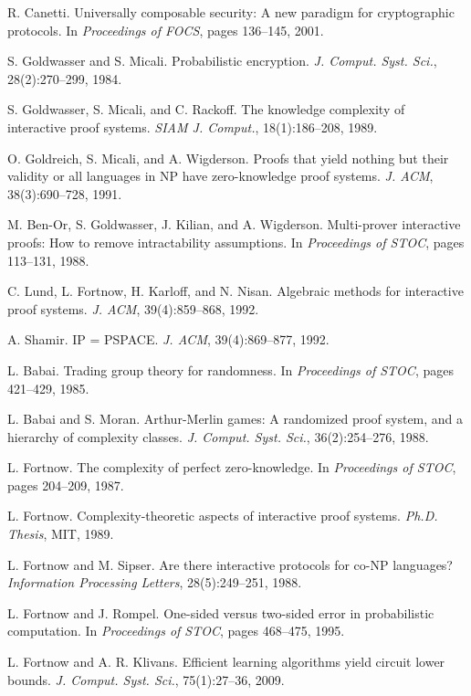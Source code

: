 \documentclass[11pt]{article}
\theoremstyle{plain}
\theoremstyle{definition}
\begin{document}
\begin{thebibliography}{99}
 R. Canetti. Universally composable security: A new paradigm for cryptographic protocols. In \emph{Proceedings of FOCS}, pages 136--145, 2001.

 S. Goldwasser and S. Micali. Probabilistic encryption. \emph{J. Comput. Syst. Sci.}, 28(2):270--299, 1984.

 S. Goldwasser, S. Micali, and C. Rackoff. The knowledge complexity of interactive proof systems. \emph{SIAM J. Comput.}, 18(1):186--208, 1989.

 O. Goldreich, S. Micali, and A. Wigderson. Proofs that yield nothing but their validity or all languages in NP have zero-knowledge proof systems. \emph{J. ACM}, 38(3):690--728, 1991.

 M. Ben-Or, S. Goldwasser, J. Kilian, and A. Wigderson. Multi-prover interactive proofs: How to remove intractability assumptions. In \emph{Proceedings of STOC}, pages 113--131, 1988.

 C. Lund, L. Fortnow, H. Karloff, and N. Nisan. Algebraic methods for interactive proof systems. \emph{J. ACM}, 39(4):859--868, 1992.

 A. Shamir. IP = PSPACE. \emph{J. ACM}, 39(4):869--877, 1992.

 L. Babai. Trading group theory for randomness. In \emph{Proceedings of STOC}, pages 421--429, 1985.

 L. Babai and S. Moran. Arthur-Merlin games: A randomized proof system, and a hierarchy of complexity classes. \emph{J. Comput. Syst. Sci.}, 36(2):254--276, 1988.

 L. Fortnow. The complexity of perfect zero-knowledge. In \emph{Proceedings of STOC}, pages 204--209, 1987.

 L. Fortnow. Complexity-theoretic aspects of interactive proof systems. \emph{Ph.D. Thesis}, MIT, 1989.

 L. Fortnow and M. Sipser. Are there interactive protocols for co-NP languages? \emph{Information Processing Letters}, 28(5):249--251, 1988.

 L. Fortnow and J. Rompel. One-sided versus two-sided error in probabilistic computation. In \emph{Proceedings of STOC}, pages 468--475, 1995.

 L. Fortnow and A. R. Klivans. Efficient learning algorithms yield circuit lower bounds. \emph{J. Comput. Syst. Sci.}, 75(1):27--36, 2009.


\end{thebibliography}
\end{document}
